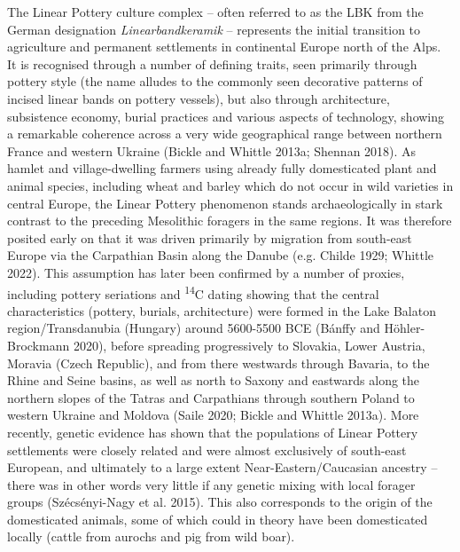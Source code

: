 \documentclass[
  12pt,
  a4paper, twoside]{book}
\begin{document}
The Linear Pottery culture complex -- often referred to as the LBK from the German designation \emph{Linearbandkeramik} -- represents the initial transition to agriculture and permanent settlements in continental Europe north of the Alps. It is recognised through a number of defining traits, seen primarily through pottery style (the name alludes to the commonly seen decorative patterns of incised linear bands on pottery vessels), but also through architecture, subsistence economy, burial practices and various aspects of technology, showing a remarkable coherence across a very wide geographical range between northern France and western Ukraine (Bickle and Whittle 2013a; Shennan 2018). As hamlet and village-dwelling farmers using already fully domesticated plant and animal species, including wheat and barley which do not occur in wild varieties in central Europe, the Linear Pottery phenomenon stands archaeologically in stark contrast to the preceding Mesolithic foragers in the same regions. It was therefore posited early on that it was driven primarily by migration from south-east Europe via the Carpathian Basin along the Danube (e.g. Childe 1929; Whittle 2022). This assumption has later been confirmed by a number of proxies, including pottery seriations and \textsuperscript{14}C dating showing that the central characteristics (pottery, burials, architecture) were formed in the Lake Balaton region/Transdanubia (Hungary) around 5600-5500 BCE (Bánffy and Höhler-Brockmann 2020), before spreading progressively to Slovakia, Lower Austria, Moravia (Czech Republic), and from there westwards through Bavaria, to the Rhine and Seine basins, as well as north to Saxony and eastwards along the northern slopes of the Tatras and Carpathians through southern Poland to western Ukraine and Moldova (Saile 2020; Bickle and Whittle 2013a). More recently, genetic evidence has shown that the populations of Linear Pottery settlements were closely related and were almost exclusively of south-east European, and ultimately to a large extent Near-Eastern/Caucasian ancestry -- there was in other words very little if any genetic mixing with local forager groups (Szécsényi-Nagy et al. 2015). This also corresponds to the origin of the domesticated animals, some of which could in theory have been domesticated locally (cattle from aurochs and pig from wild boar).
\end{document}
